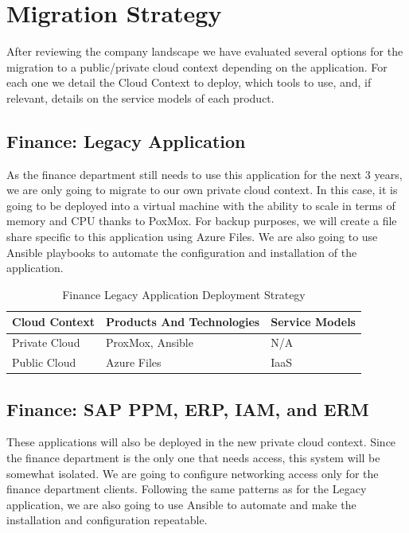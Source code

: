 \documentclass{llncs}
\begin{document}
\section{Migration Strategy}

After reviewing the company landscape we have evaluated several options for the migration to a public/private cloud context depending on the application.
For each one we detail the Cloud Context to deploy, which tools to use, and, if relevant, details on the service models of each product.

\subsection{Finance: Legacy Application}

As the finance department still needs to use this application for the next 3 years, we are only going to migrate to our own private cloud context.
In this case, it is going to be deployed into a virtual machine with the ability to scale in terms of memory and CPU thanks to PoxMox.
For backup purposes, we will create a file share specific to this application using Azure Files.
We are also going to use Ansible playbooks to automate the configuration and installation of the application.\\

\begin{table}[h!]
    \centering
    \begin{tabular}{lll}
        \hline
        \textbf{Cloud Context} & \textbf{Products And Technologies} & \textbf{Service Models} \\
        \hline
        Private Cloud          & ProxMox, Ansible                   & N/A                     \\
        \hline
        Public Cloud           & Azure Files                        & IaaS                    \\
        \hline
    \end{tabular}
    \caption{Finance Legacy Application Deployment Strategy}
\end{table}


\subsection{Finance: SAP PPM, ERP, IAM, and ERM}
These applications will also be deployed in the new private cloud context.
Since the finance department is the only one that needs access, this system will be somewhat isolated.
We are going to configure networking access only for the finance department clients.
Following the same patterns as for the Legacy application, we are also going to use Ansible to automate and make the installation and configuration repeatable.\\
\end{document}
